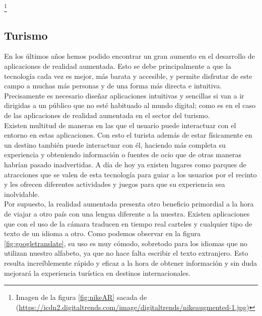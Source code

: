  {\let\thefootnote\relax\footnote{{Imagen de la figura \ref{fig:nikeAR} sacada de (\url{https://icdn2.digitaltrends.com/image/digitaltrends/nikeaugmented-1.jpg})}}

\subsection{Turismo}
En los últimos años hemos podido encontrar un gran aumento en el desarrollo de aplicaciones de realidad aumentada. Esto se debe principalmente a que la tecnología cada vez es mejor, más barata y accesible, y permite disfrutar de este campo a muchas más personas y de una forma más directa e intuitiva. Precisamente es necesario diseñar aplicaciones intuitivas y sencillas si van a ir dirigidas a un público que no esté habituado al mundo digital; como es en el caso de las aplicaciones de realidad aumentada en el sector del turismo.\cite{Neosentec_Tur}\\

Existen multitud de maneras en las que el usuario puede interactuar con el entorno en estas aplicaciones. Con esto el turista además de estar físicamente en un destino también puede interactuar con él, haciendo más completa su experiencia y obteniendo información o fuentes de ocio que de otras maneras habrían pasado inadvertidas. A día de hoy ya existen lugares como parques de atracciones que se valen de esta tecnología para guiar a los usuarios por el recinto y les ofrecen diferentes actividades y juegos para que su experiencia sea inolvidable.\\

Por supuesto, la realidad aumentada presenta otro beneficio primordial a la hora de viajar a otro país con una lengua diferente a la nuestra. Existen aplicaciones que con el uso de la cámara traducen en tiempo real carteles y cualquier tipo de texto de un idioma a otro. Como podemos observar en la figura \ref{fig:googletranslate}, su uso es muy cómodo, sobretodo para los idiomas que no utilizan nuestro alfabeto, ya que no hace falta escribir el texto extranjero. Esto resulta increíblemente rápido y eficaz a la hora de obtener información y sin duda mejorará la experiencia turística en destinos internacionales.

}
